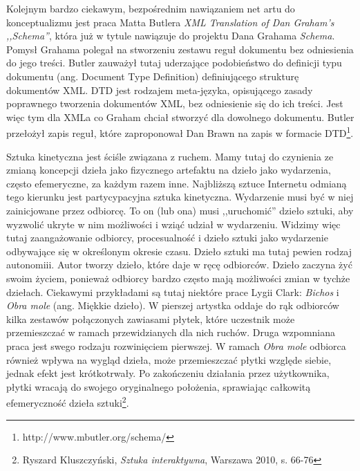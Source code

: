 \documentclass[a4paper,12pt,twoside]{article}
\begin{document}

Kolejnym bardzo ciekawym, bezpośrednim nawiązaniem net artu do konceptualizmu
jest praca Matta Butlera \textit{XML Translation of Dan Graham's ,,Schema''},
która już w tytule nawiązuje do projektu Dana Grahama \textit{Schema}. 
Pomysł Grahama polegał na stworzeniu zestawu reguł dokumentu bez odniesienia
do jego treści. Butler zauważył tutaj uderzające podobieństwo do definicji
typu dokumentu (ang. Document Type Definition) definiującego strukturę
dokumentów XML. DTD jest rodzajem meta-języka, opisującego zasady poprawnego
tworzenia dokumentów XML, bez odniesienie się do ich treści. Jest więc tym
dla XMLa co Graham chciał stworzyć dla dowolnego dokumentu.
Butler przełożył zapis reguł, które zaproponował Dan Brawn na zapis w formacie
DTD\footnote{ http://www.mbutler.org/schema/}.

Sztuka kinetyczna jest ściśle związana z ruchem. Mamy tutaj do czynienia
ze zmianą koncepcji dzieła jako fizycznego artefaktu na dzieło
jako wydarzenia, często efemeryczne, za każdym razem inne. Najbliższą sztuce
Internetu odmianą tego kierunku jest partycypacyjna sztuka kinetyczna.
Wydarzenie musi być w niej zainicjowane przez odbiorcę. To on (lub ona)
musi ,,uruchomić'' dzieło sztuki, aby wyzwolić ukryte w nim możliwości
i wziąć udział w wydarzeniu. Widzimy więc tutaj zaangażowanie
odbiorcy, procesualność i dzieło sztuki jako wydarzenie odbywające się
w określonym okresie czasu. Dzieło sztuki ma tutaj pewien rodzaj
autonomiii. Autor tworzy dzieło, które daje w ręcę odbiorców. Dzieło
zaczyna żyć swoim życiem, ponieważ odbiorcy bardzo często mają możliwości
zmian w tychże dziełach. Ciekawymi przykładami są tutaj niektóre prace
Lygii Clark: \textit{Bichos} i \textit{Obra mole} (ang. Miękkie dzieło).
W pierszej artystka oddaje do rąk odbiorców kilka zestawów
połączonych zawiasami płytek, które uczestnik może przemieszczać w ramach
przewidzianych dla nich ruchów. Druga wzpomniana praca jest swego rodzaju
rozwinięciem pierwszej. W ramach \textit{Obra mole} odbiorca również
wpływa na wygląd dzieła, może przemieszczać płytki względe siebie,
jednak efekt jest krótkotrwały. Po zakończeniu działania przez użytkownika,
płytki wracają do swojego oryginalnego położenia, sprawiając całkowitą
efemeryczność dzieła
sztuki\footnote{ Ryszard Kluszczyński, \textit{Sztuka interaktywna},
Warszawa 2010, s. 66-76}.
\end{document}
